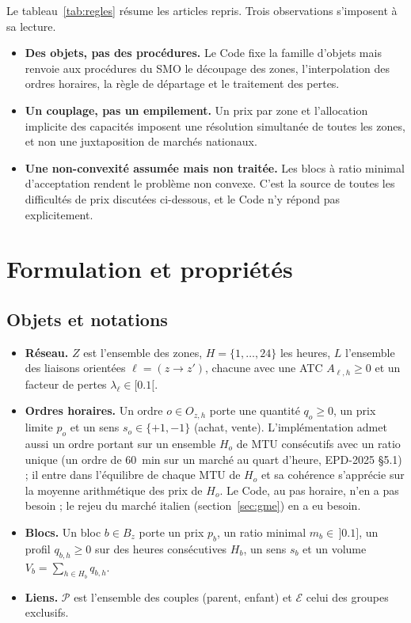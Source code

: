 \documentclass[a4paper,12pt]{article}
\theoremstyle{definition}
\begin{document}
Le tableau~\ref{tab:regles} résume les articles repris. Trois observations s'imposent à sa lecture.

\begin{itemize}
\item \textbf{Des objets, pas des procédures.} Le Code fixe la famille d'objets mais renvoie aux procédures du SMO le découpage des zones, l'interpolation des ordres horaires, la règle de départage et le traitement des pertes.
\item \textbf{Un couplage, pas un empilement.} Un prix par zone et l'allocation implicite des capacités imposent une résolution simultanée de toutes les zones, et non une juxtaposition de marchés nationaux.
\item \textbf{Une non-convexité assumée mais non traitée.} Les blocs à ratio minimal d'acceptation rendent le problème non convexe. C'est la source de toutes les difficultés de prix discutées ci-dessous, et le Code n'y répond pas explicitement.
\end{itemize}

\section{Formulation et propriétés}\label{sec:formulation}

\subsection{Objets et notations}

\begin{itemize}
\item \textbf{Réseau.} $Z$ est l'ensemble des zones, $H=\{1,\dots,24\}$ les heures, $L$ l'ensemble des liaisons orientées $\ell=(z\to z')$, chacune avec une ATC $A_{\ell,h}\ge 0$ et un facteur de pertes $\lambda_\ell\in[0.1[$.
\item \textbf{Ordres horaires.} Un ordre $o\in O_{z,h}$ porte une quantité $q_o\ge 0$, un prix limite $p_o$ et un sens $s_o\in\{+1,-1\}$ (achat, vente). L'implémentation admet aussi un ordre portant sur un ensemble $H_o$ de MTU consécutifs avec un ratio unique (un ordre de 60~min sur un marché au quart d'heure, EPD-2025 §5.1) ; il entre dans l'équilibre de chaque MTU de $H_o$ et sa cohérence s'apprécie sur la moyenne arithmétique des prix de $H_o$. Le Code, au pas horaire, n'en a pas besoin ; le rejeu du marché italien (section~\ref{sec:gme}) en a eu besoin.
\item \textbf{Blocs.} Un bloc $b\in B_z$ porte un prix $p_b$, un ratio minimal $m_b\in\,]0.1]$, un profil $q_{b,h}\ge0$ sur des heures consécutives $H_b$, un sens $s_b$ et un volume $V_b=\sum_{h\in H_b}q_{b,h}$.
\item \textbf{Liens.} $\mathcal P$ est l'ensemble des couples (parent, enfant) et $\mathcal E$ celui des groupes exclusifs.
\end{itemize}
\end{document}
